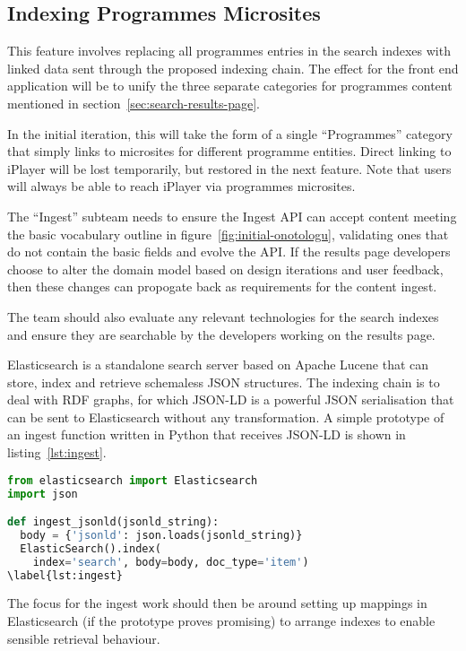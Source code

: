 \subsection{Indexing Programmes Microsites}

This feature involves replacing all programmes entries in
the search indexes with linked data sent through the proposed
indexing chain. The effect for the front end application
will be to unify the three separate categories for
programmes content mentioned in section~\ref{sec:search-results-page}.

In the initial iteration, this will take the form of a single
``Programmes'' category that simply links to microsites
for different programme entities. Direct linking to iPlayer
will be lost temporarily, but restored in the next
feature. Note that users will always be able to reach
iPlayer via programmes microsites.

The ``Ingest'' subteam needs to ensure the Ingest API can
accept content meeting the basic vocabulary outline in
figure~\ref{fig:initial-onotologu}, validating ones
that do not contain the basic fields and evolve the API. If
the results page developers choose to alter the domain
model based on design iterations and user feedback, then
these changes can propogate back as requirements for the
content ingest.

The team should also evaluate any relevant technologies for the
search indexes and ensure they are searchable by the
developers working on the results page.

Elasticsearch is a standalone search server based on Apache Lucene
that can store, index and retrieve schemaless JSON structures.
The indexing chain is to deal with RDF graphs, for which JSON-LD
is a powerful JSON serialisation that can be sent to Elasticsearch
without any transformation.
A simple prototype of an ingest function written in Python
that receives JSON-LD is shown in listing~\ref{lst:ingest}.

\begin{lstlisting}[language=Python]
from elasticsearch import Elasticsearch
import json

def ingest_jsonld(jsonld_string):
  body = {'jsonld': json.loads(jsonld_string)}
  ElasticSearch().index(
    index='search', body=body, doc_type='item')
\label{lst:ingest}
\end{lstlisting}

The focus for the ingest work should then be around setting
up mappings in Elasticsearch (if the prototype proves promising)
to arrange indexes to enable sensible retrieval behaviour.

